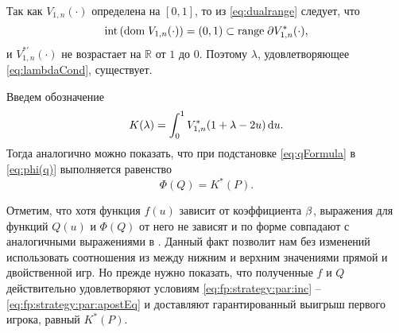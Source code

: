 Так как $V_{1,n}(\cdot)$ определена на $[0, 1]$, то из \eqref{eq:dualrange}
следует, что
\begin{equation*}
  \mathrm{int} \left( \mathrm{dom\;} V_{1,n}(\cdot) \right)
  = (0, 1)
  \subset \mathrm{range\;} \partial V_{1,n}^*(\cdot),
\end{equation*}
и $V^{*\prime}_{1,n}(\cdot)$ не возрастает на $\mathbb{R}$ от $1$ до $0$.
Поэтому $\lambda$, удовлетворяющее \eqref{eq:lambdaCond}, существует.

Введем обозначение
\begin{equation*}
  K(\lambda) = \int_0^1 V^*_{1,n}(1+\lambda-2u) \mathop{}\!\mathrm{d} u.
\end{equation*}
Тогда аналогично \cite{demeyer02} можно показать, что при подстановке
\eqref{eq:qFormula} в \eqref{eq:phi(q)} выполняется равенство
\begin{equation}\label{eq:phi=k*}
  \Phi(Q) = K^*(P).
\end{equation}

Отметим, что хотя функция $f(u)$ зависит от коэффициента $\beta$, выражения для
функций $Q(u)$ и $\Phi(Q)$ от него не зависят и по форме совпадают с
аналогичными выражениями в \cite{demeyer02}. Данный факт позволит нам без
изменений использовать соотношения из \cite{demeyer02} между нижним и верхним
значениями прямой и двойственной игр. Но прежде нужно показать, что полученные
$f$ и $Q$ действительно удовлетворяют условиям \eqref{eq:fp:strategy:par:inc} --
\eqref{eq:fp:strategy:par:apostEq} и доставляют гарантированный выигрыш первого
игрока, равный $K^*(P)$.

